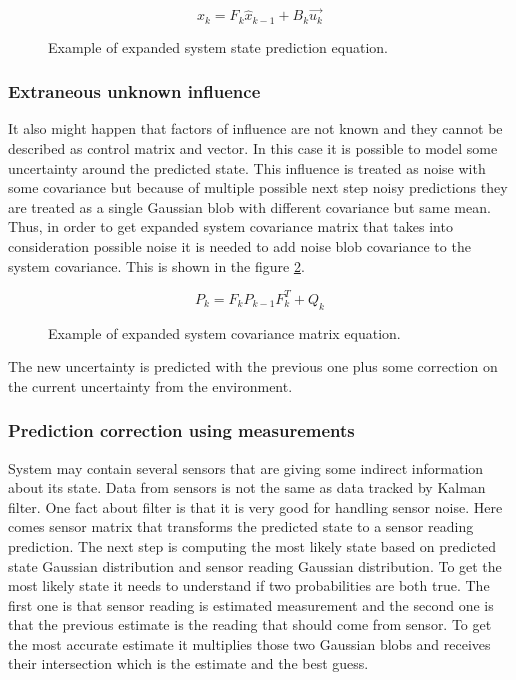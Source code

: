 \documentclass[../../main]{subfiles}
\begin{document}
\begin{figure} [!ht]
  \centering    
    \begin{equation}
       \hat{x_k} = F_k \hat{x}_{k-1} + B_k\vec{u_k}
    \end{equation}
    \label{fig:kalman_expanded_state_prediction}
  \caption{Example of expanded system state prediction equation.}
\end{figure}

\subsubsection*{Extraneous unknown influence}

It also might happen that factors of influence are not known and they cannot be described as control matrix and vector. In this case it is possible to model some uncertainty around the predicted state. This influence is treated as noise with some covariance but because of multiple possible next step noisy predictions they are treated as a single Gaussian blob with different covariance but same mean.
Thus, in order to get expanded system covariance matrix that takes into consideration possible noise it is needed to add noise blob covariance to the system covariance. This is shown in the figure \ref{ref:kalman_expanded_covariance_matrix}.

\begin{figure} [!ht]
  \centering    
    \begin{equation}
       P_k = F_k P_{k-1}  F_k^T + Q_k
    \end{equation}
    \label{ref:kalman_expanded_covariance_matrix}
  \caption{Example of expanded system covariance matrix equation.}
\end{figure}

The new uncertainty is predicted with the previous one plus some correction on the current uncertainty from the environment.

\subsubsection*{Prediction correction using measurements}

System may contain several sensors that are giving some indirect information about its state. Data from sensors is not the same as data tracked by Kalman filter. One fact about filter is that it is very good for handling sensor noise.
Here comes sensor matrix that transforms the predicted state to a sensor reading prediction. The next step is computing the most likely state based on predicted state Gaussian distribution and sensor reading Gaussian distribution. To get the most likely state it needs to understand if two probabilities are both true. The first one is that sensor reading is estimated measurement and the second one is that the previous estimate is the reading that should come from sensor. To get the most accurate estimate it multiplies those two Gaussian blobs and receives their intersection which is the estimate and the best guess. 
\end{document}
